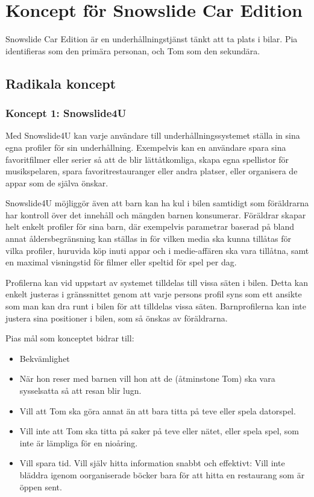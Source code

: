 \documentclass[a4paper,12pt,titlepage]{article}
\begin{document}
\section*{Koncept för Snowslide Car Edition}

Snowslide Car Edition är en underhållningstjänst tänkt att ta plats i bilar.
Pia identifieras som den primära personan, och Tom som den sekundära.

\subsection*{Radikala koncept}

\subsubsection*{Koncept 1: Snowslide4U}
Med Snowslide4U kan varje användare till underhållningssystemet ställa in sina
egna profiler för sin underhållning. Exempelvis kan en användare spara sina
favoritfilmer eller serier så att de blir lättåtkomliga, skapa egna
spellistor för musikspelaren, spara favoritrestauranger eller andra platser,
eller organisera de appar som de själva önskar.

Snowslide4U möjliggör även att barn kan ha kul i bilen samtidigt som föräldrarna
har kontroll över det innehåll och mängden barnen konsumerar.
Föräldrar skapar helt enkelt profiler för sina barn,
där exempelvis parametrar baserad på bland annat åldersbegränsning kan ställas in
för vilken media ska kunna tillåtas för vilka profiler, huruvida köp inuti
appar och i medie-affären ska vara tillåtna, samt en maximal visningstid för
filmer eller speltid för spel per dag.

Profilerna kan vid uppstart av systemet tilldelas till vissa säten i bilen.
Detta kan enkelt justeras i gränssnittet genom att varje persons profil syns som
ett ansikte som man kan dra runt i bilen för att tilldelas vissa säten.
Barnprofilerna kan inte justera sina positioner i bilen, som så önskas av
föräldrarna.

Pias mål som konceptet bidrar till:
\begin{itemize}
    \item Bekvämlighet
    \item När hon reser med barnen vill
        hon att de (åtminstone Tom) ska vara
        sysselsatta så att resan blir lugn.
    \item Vill att Tom ska göra annat än att
        bara titta på teve eller spela datorspel.
    \item Vill inte att Tom ska titta på saker
        på teve eller nätet, eller spela spel,
        som inte är lämpliga för en nioåring.
    \item Vill spara tid. Vill själv hitta
        information snabbt och effektivt: Vill
        inte bläddra igenom oorganiserade
        böcker bara för att hitta en restaurang
        som är öppen sent.
\end{itemize}
\end{document}
